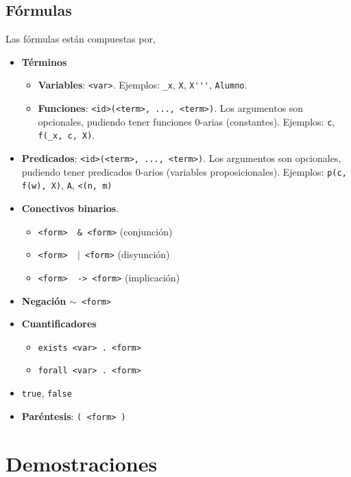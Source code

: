 \subsection{Fórmulas}

Las fórmulas están compuestas por,

\begin{itemize}
    \item \textbf{Términos}
    \begin{itemize}
        \item \textbf{Variables}: \texttt{<var>}. Ejemplos: \lstinline{_x},
        \lstinline{X}, \lstinline{X'''}, \lstinline{Alumno}.
        \item \textbf{Funciones}: \texttt{<id>(<term>, ..., <term>)}. Los
        argumentos son opcionales, pudiendo tener funciones 0-arias
        (constantes). Ejemplos:  \lstinline{c}, \lstinline{f(_x, c, X)}.
    \end{itemize}
    \item \textbf{Predicados}: \texttt{<id>(<term>, ..., <term>)}. Los
    argumentos son opcionales, pudiendo tener predicados 0-arios (variables
    proposicionales). Ejemplos: \lstinline{p(c, f(w), X)}, \lstinline{A},
    \lstinline{<(n, m)}
    \item \textbf{Conectivos binarios}.
    \begin{itemize}
        \item \texttt{<form> \ \& <form>} (conjunción)
        \item \texttt{<form> \ $\mid$ <form>} (disyunción)
        \item \texttt{<form> \ ->\ <form>} (implicación)
    \end{itemize}
    \item \textbf{Negación} \texttt{$\sim$ <form>}
    \item \textbf{Cuantificadores}
    \begin{itemize}
        \item \texttt{exists <var> . <form>}
        \item \texttt{forall <var> . <form>}
    \end{itemize}
    \item \texttt{true}, \texttt{false}
    \item \textbf{Paréntesis}: \texttt{( <form>\ )}
\end{itemize}


\section{Demostraciones}

